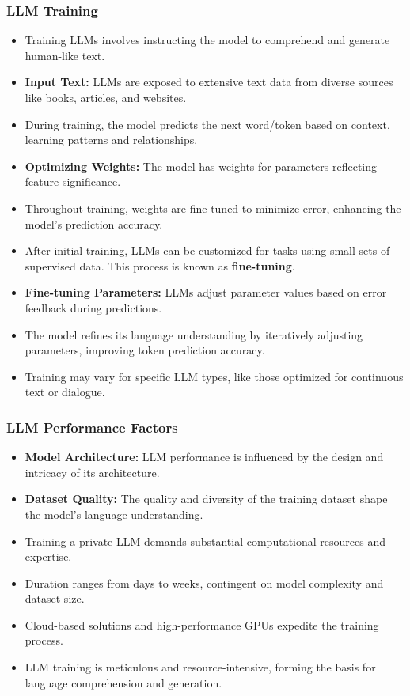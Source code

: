 \begin{frame}[fragile]\frametitle{LLM Training}
  \begin{itemize}
    \item Training LLMs involves instructing the model to comprehend and generate human-like text.
    \item \textbf{Input Text:} LLMs are exposed to extensive text data from diverse sources like books, articles, and websites.
    \item During training, the model predicts the next word/token based on context, learning patterns and relationships.
    \item \textbf{Optimizing Weights:} The model has weights for parameters reflecting feature significance.
    \item Throughout training, weights are fine-tuned to minimize error, enhancing the model's prediction accuracy.
	\item After initial training, LLMs can be customized for tasks using small sets of supervised data. This process is known as \textbf{fine-tuning}.
    \item \textbf{Fine-tuning Parameters:} LLMs adjust parameter values based on error feedback during predictions. 
    \item The model refines its language understanding by iteratively adjusting parameters, improving token prediction accuracy.
    \item Training may vary for specific LLM types, like those optimized for continuous text or dialogue.
  \end{itemize}
\end{frame}

\begin{frame}[fragile]\frametitle{LLM Performance Factors}
  \begin{itemize}
    \item \textbf{Model Architecture:} LLM performance is influenced by the design and intricacy of its architecture.
    \item \textbf{Dataset Quality:} The quality and diversity of the training dataset shape the model's language understanding.
    \item Training a private LLM demands substantial computational resources and expertise.
    \item Duration ranges from days to weeks, contingent on model complexity and dataset size.
    \item Cloud-based solutions and high-performance GPUs expedite the training process.
    \item LLM training is meticulous and resource-intensive, forming the basis for language comprehension and generation.
  \end{itemize}
\end{frame}

